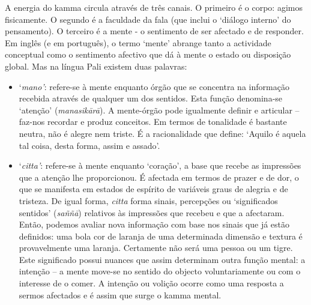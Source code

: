 A energia do kamma circula através de três canais. O primeiro é o corpo: agimos
fisicamente. O segundo é a faculdade da fala (que inclui o `diálogo interno' do
pensamento). O terceiro é a mente - o sentimento de ser afectado e de responder.
Em inglês (e em português), o termo `mente' abrange tanto a actividade
conceptual como o sentimento afectivo que dá à mente o estado ou disposição
global. Mas na língua Pali existem duas palavras:

\begin{itemize}

  \item `\emph{mano'}: refere-se à mente enquanto órgão que se concentra na
        informação recebida através de qualquer um dos sentidos. Esta função
        denomina-se `atenção' (\emph{manasikārā}). A mente-órgão pode igualmente
        definir e articular -- faz-nos recordar e produz conceitos. Em termos de
        tonalidade é bastante neutra, não é alegre nem triste. É a racionalidade
        que define: `Aquilo é aquela tal coisa, desta forma, assim e assado'.

  \item `\emph{citta'}: refere-se à mente enquanto `coração', a base que recebe
        as impressões que a atenção lhe proporcionou. É afectada em termos de
        prazer e de dor, o que se manifesta em estados de espírito de variáveis
        graus de alegria e de tristeza. De igual forma, \emph{citta} forma
        sinais, percepções ou `significados sentidos' (\emph{saññā}) relativos
        às impressões que recebeu e que a afectaram. Então, podemos avaliar nova
        informação com base nos sinais que já estão definidos: uma bola cor de
        laranja de uma determinada dimensão e textura é provavelmente uma
        laranja. Certamente não será uma pessoa ou um tigre. Este significado
        possui nuances que assim determinam outra função mental: a intenção -- a
        mente move-se no sentido do objecto voluntariamente ou com o interesse
        de o comer. A intenção ou volição ocorre como uma resposta a sermos
        afectados e é assim que surge o kamma mental.

\end{itemize}

